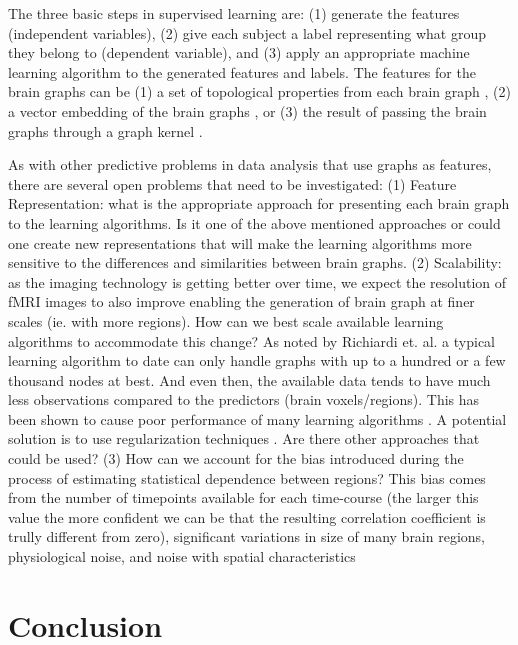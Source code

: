The three basic steps in supervised learning are: (1) generate the features (independent variables), (2) give each subject a label representing what group they belong to (dependent variable), and (3) apply an appropriate machine learning algorithm to the generated features and labels. The features for the brain graphs can be (1) a set of topological properties from each brain graph \cite{Cecci2009, Bassett2012}, (2) a vector embedding of the brain graphs \cite{Richiadi2013,Luo2003}, or (3) the result of passing the brain graphs through a graph kernel \cite{}. 

As with other predictive problems in data analysis that use graphs as features, there are several open problems that need to be investigated: (1) Feature Representation: what is the appropriate approach for presenting each brain graph to the learning algorithms. Is it one of the above mentioned approaches or could one create new representations that will make the learning algorithms more sensitive to the differences and similarities between brain graphs. (2) Scalability: as the imaging technology is getting better over time, we expect the resolution of fMRI images to also improve enabling the generation of brain graph at finer scales (ie. with more regions). How can we best scale available learning algorithms to accommodate this change? As noted by Richiardi et. al. \cite{Richiardi} a typical learning algorithm to date can only handle graphs with up to a hundred or a few thousand nodes at best. And even then, the available data tends to have much less observations compared to the predictors (brain voxels/regions). This has been shown to cause poor performance of many learning algorithms \cite{Hastie}. A potential solution is to use regularization techniques \cite{WeeMICCAI}. Are there other approaches that could be used? (3) How can we account for the bias introduced during the process of estimating statistical dependence between regions? This bias comes from the number of timepoints available for each time-course (the larger this value the more confident we can be that the resulting correlation coefficient is trully different from zero), significant variations in size of many brain regions, physiological noise, and noise with spatial characteristics \cite{Richiardi}

\section*{Conclusion}

